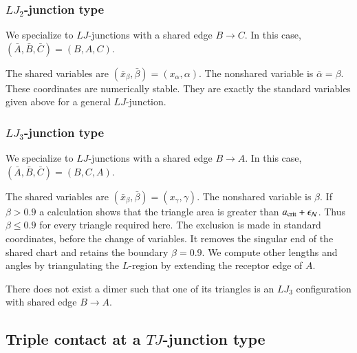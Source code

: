 \subsubsection{$LJ_2$-junction type}

We specialize to $LJ$-junctions with a shared edge $B\to C$.
In this case, $(\bar A,\bar B,\bar C)=(B,A,C)$.

The shared variables are $(\bar x_\beta,\bar\beta)=(x_\alpha,\alpha)$.
The nonshared variable is $\bar\alpha=\beta$.  These coordinates are
numerically stable.  They are exactly the standard variables given
above for a general $LJ$-junction.

\subsubsection{$LJ_3$-junction type}

We specialize to $LJ$-junctions with a shared edge $B\to A$.
In this case, $(\bar A,\bar B,\bar C)=(B,C,A)$.

The shared variables are $(\bar x_\beta,\bar\beta)=(x_\gamma,\gamma)$.
The nonshared variable is $\beta$.  If $\beta > 0.9$ a
calculation shows that the triangle area is greater
than $a_\text{crit}+\epsilon_{\mathcal N}$. Thus $\beta\le0.9$ for every triangle
required here. The exclusion is made in standard coordinates, before
the change of variables. It removes the singular end of the shared
chart and retains the boundary $\beta=0.9$.  We
compute other lengths and angles by triangulating the $L$-region by
extending the receptor edge of $A$.

There does not exist a dimer such that one of its triangles
is an $LJ_3$ configuration with shared edge $B\to A$.

\subsection{Triple contact at a $TJ$-junction type}

